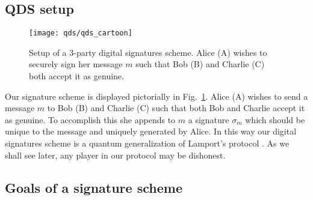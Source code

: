 \subsection{QDS setup}

\begin{figure}[htp]
\centering
\texttt{[image: qds/qds\_cartoon]}
\caption{\label{fig:qds_cartoon} Setup of a $3$-party digital signatures scheme. Alice (A) wishes to securely sign her message $m$ such that Bob (B) and Charlie (C) both accept it as genuine.}
\end{figure}

Our signature scheme is displayed pictorially in Fig.~\ref{fig:qds_cartoon}. Alice (A) wishes to send a message $m$ to Bob (B) and Charlie (C) such that both Bob and Charlie accept it as genuine. To accomplish this she appends to $m$ a signature $\sigma_m$ which should be unique to the message and uniquely generated by Alice. In this way our digital signatures scheme is a quantum generalization of Lamport's protocol \cite{Schneier1996}. As we shall see later, any player in our protocol may be dishonest.

\subsection{Goals of a signature scheme}\label{sec:qds_goals}




